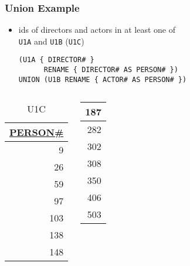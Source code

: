 \documentclass[dvipsnames]{beamer}
\theoremstyle{plain}
\begin{document}
\begin{frame}[fragile]
  \frametitle{Union Example}

  \begin{itemize}
    \item ids of directors and actors in at least one of\\
      \texttt{U1A} and \texttt{U1B} (\texttt{U1C})
    \begin{lstlisting}
(U1A { DIRECTOR# }
      RENAME { DIRECTOR# AS PERSON# })
UNION (U1B RENAME { ACTOR# AS PERSON# })
    \end{lstlisting}
  \end{itemize}

  \vspace{-10pt}
  \begin{columns}[b]
    \begin{tiny}
    \begin{table}
      \caption{U1C}
      \begin{tabular}{|r|}\hline
\underline{PERSON\#}\\[2pt]\hline\hline
                  9\\\hline
                 26\\\hline
                 59\\\hline
                 97\\\hline
                103\\\hline
                138\\\hline
                148\\\hline
      \end{tabular}
    \end{table}
    \end{tiny}

    \begin{tiny}
    \begin{table}
      \begin{tabular}{|r|}\hline
                187\\\hline
                282\\\hline
                302\\\hline
                308\\\hline
                350\\\hline
                406\\\hline
                503\\\hline
      \end{tabular}
    \end{table}
    \end{tiny}


\end{columns}
\end{frame}
\end{document}
